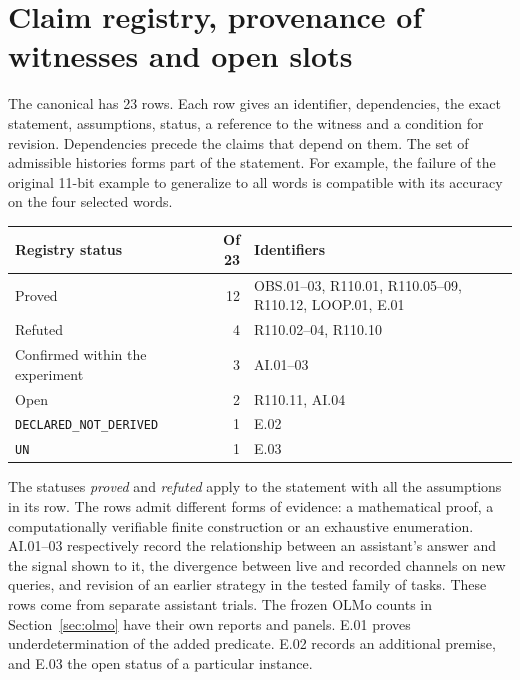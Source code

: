\section{Claim registry, provenance of witnesses and open slots}
\label{app:registers}

The canonical  has 23 rows. Each row gives an identifier, dependencies, the exact statement, assumptions, status, a reference to the witness and a condition for revision. Dependencies precede the claims that depend on them. The set of admissible histories forms part of the statement. For example, the failure of the original 11-bit example to generalize to all words is compatible with its accuracy on the four selected words.

\begin{center}
\begin{tabularx}{\linewidth}{@{}l r X@{}}
\toprule
Registry status & Of 23 & Identifiers \\
\midrule
Proved & 12 & OBS.01--03, R110.01, R110.05--09, R110.12, LOOP.01, E.01 \\
Refuted & 4 & R110.02--04, R110.10 \\
Confirmed within the experiment & 3 & AI.01--03 \\
Open & 2 & R110.11, AI.04 \\
\texttt{DECLARED\_NOT\_DERIVED} & 1 & E.02 \\
\texttt{UN} & 1 & E.03 \\
\bottomrule
\end{tabularx}
\end{center}

The statuses \emph{proved} and \emph{refuted} apply to the statement with all the assumptions in its row. The rows admit different forms of evidence: a mathematical proof, a computationally verifiable finite construction or an exhaustive enumeration. AI.01--03 respectively record the relationship between an assistant's answer and the signal shown to it, the divergence between live and recorded channels on new queries, and revision of an earlier strategy in the tested family of tasks. These rows come from separate assistant trials. The frozen OLMo counts in Section~\ref{sec:olmo} have their own reports and panels. E.01 proves underdetermination of the added predicate. E.02 records an additional premise, and E.03 the open status of a particular instance.

